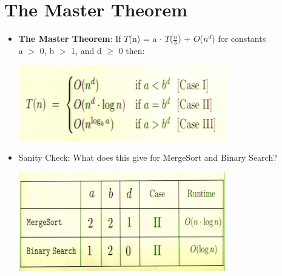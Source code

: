 \documentclass[12pt]{article}
\begin{document}
\section{The Master Theorem}
\renewcommand{\labelitemii}{$\circ$}
\renewcommand{\labelitemiii}{$\cdot$}
\renewcommand{\labelitemiii}{$\rightarrow$}
\begin{itemize}
\item \textbf{The Master Theorem}: If {\large $T$(n) = a $\cdot$ $T$($\frac{n}{b}$) + $O$($n^d$) }for constants    \\
a $>$ 0, b $>$ 1, and d $\geq$ 0 then:
\begin{center}
\includegraphics{lecture3a}
\end{center}
\item Sanity Check: What does this give for MergeSort and Binary Search?
\begin{center}
\includegraphics{lecture3b}
\end{center}
\end{itemize}
\noindent \\
\noindent \\
\noindent \\
\noindent \\
\noindent \\
\noindent \\
\noindent \\
\noindent \\
\noindent \\
\noindent \\
\noindent \\
\noindent \\
\noindent \\
\end{document}
